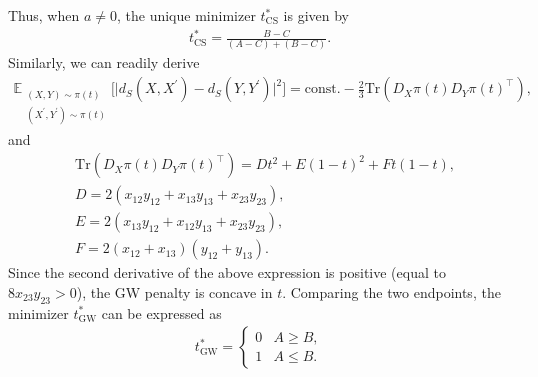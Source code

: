 \documentclass{article}
\begin{document}
Thus, when $a \neq 0$, the unique minimizer $t_{\mathrm{CS}}^\ast$ is given by 
\begin{align*}
	t_{\mathrm{CS}}^\ast = \frac{B - C}{(A - C) + (B - C)} .
\end{align*}
Similarly, we can readily derive
\begin{align*}
	\mathbb{E}_{\substack{(X,Y)\sim\pi(t)\\(X^\prime,Y^\prime)\sim\pi(t)}}
	\Big[\big|d_S(X,X^\prime)-d_S(Y,Y^\prime)\big|^2\Big] = \mathrm{const.} - \frac{2}{3}\mathrm{Tr}(D_X \pi(t) D_Y \pi(t)^\top) ,
\end{align*}
and
\begin{align*}
	&\mathrm{Tr}(D_X \pi(t) D_Y \pi(t)^\top) = D t^2 + E (1 - t)^2 + Ft(1-t) , \\[5pt]
	&D = 2(x_{12}y_{12} + x_{13}y_{13} + x_{23}y_{23}) , \\
	&E = 2(x_{13}y_{12} + x_{12}y_{13} + x_{23}y_{23}) , \\
	&F = 2(x_{12}+x_{13})(y_{12} + y_{13}) .
\end{align*}
Since the second derivative of the above expression is positive (equal to $8x_{23}y_{23} > 0$),  
the GW penalty is concave in $t$.  
Comparing the two endpoints, the minimizer $t_{\mathrm{GW}}^\ast$ can be expressed as
\begin{align*}
	t_{\mathrm{GW}}^\ast = \begin{cases}
		0 & A \geq B , \\
		1 & A \leq B .
	\end{cases}
\end{align*}
\end{document}
